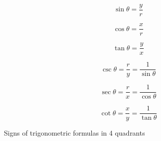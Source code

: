 \documentclass[a4paper]{book}
\begin{document}
\setlength\fboxrule{0pt}

\begin{description}
\item \begin{equation} \sin \theta = \frac{y}{r} \end{equation}
\item \begin{equation} \cos \theta = \frac{x}{r} \end{equation}
\item \begin{equation} \tan \theta = \frac{y}{x} \end{equation}
\item \begin{equation} \csc \theta = \frac{r}{y} = \frac{1}{\sin \theta} \end{equation}
\item \begin{equation} \sec \theta = \frac{r}{x} = \frac{1}{\cos \theta} \end{equation}
\item \begin{equation} \cot \theta = \frac{x}{y} = \frac{1}{\tan \theta} \end{equation}
\end{description}

Signs of trigonometric formulas in 4 quadrants

\setlength\fboxrule{0pt}
\end{document}
